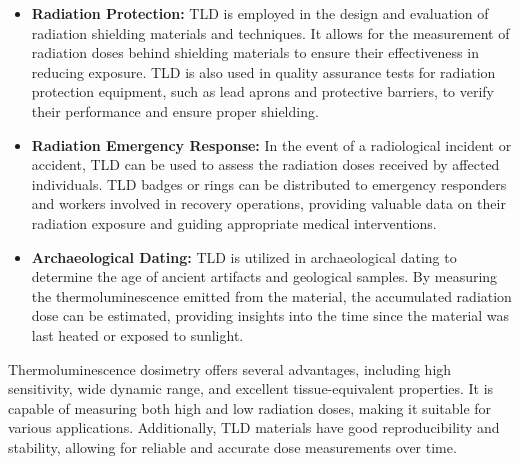 \documentclass[../../Report.tex]{subfiles}
\begin{document}
\begin{itemize}
            \item \textbf{Radiation Protection: } TLD is employed in the design and evaluation of radiation shielding 
            materials and techniques. It allows for the measurement of radiation doses behind shielding materials to 
            ensure their effectiveness in reducing exposure. TLD is also used in quality assurance tests for radiation 
            protection equipment, such as lead aprons and protective barriers, to verify their performance and ensure 
            proper shielding.

            \item \textbf{Radiation Emergency Response: } In the event of a radiological incident or accident, 
            TLD can be used to assess the radiation doses received by affected individuals. TLD badges or rings can be 
            distributed to emergency responders and workers involved in recovery operations, providing valuable data 
            on their radiation exposure and guiding appropriate medical interventions.

            \item \textbf{Archaeological Dating: } TLD is utilized in archaeological dating to determine the age of 
            ancient artifacts and geological samples. By measuring the thermoluminescence emitted from the material, 
            the accumulated radiation dose can be estimated, providing insights into the time since the material was 
            last heated or exposed to sunlight.

        \end{itemize}

    Thermoluminescence dosimetry offers several advantages, including high sensitivity, wide dynamic range, and 
    excellent tissue-equivalent properties. It is capable of measuring both high and low radiation doses, making it 
    suitable for various applications. Additionally, TLD materials have good reproducibility and stability, allowing 
    for reliable and accurate dose measurements over time.
\end{document}
